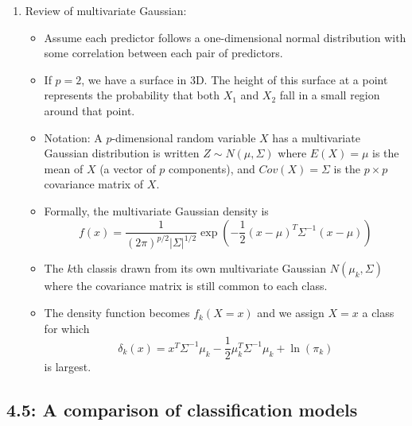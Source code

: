 \documentclass{article}
\begin{document}
\begin{enumerate}
\begin{enumerate}
\item Review of multivariate Gaussian:
\begin{itemize}
\item Assume each predictor follows a one-dimensional normal distribution with some correlation between each pair of predictors.
\item If $p=2$, we have a surface in 3D. The height of this surface at a point represents the probability that both $X_1$ and $X_2$ fall in a small region around that point.
\item Notation: A $p$-dimensional random variable $X$ has a multivariate Gaussian distribution is written $Z \sim N(\mu, \Sigma)$ where $E(X) = \mu$ is the mean of $X$ (a vector of $p$ components), and $Cov(X) = \Sigma$ is the $p \times p$ covariance matrix of $X$.
\item Formally, the multivariate Gaussian density is
\[
f(x) = \frac{1}{(2 \pi)^{p/2} |\Sigma|^{1/2}} \exp \left( - \frac{1}{2} (x-\mu)^T \Sigma^{-1} (x-\mu) \right)
\]
\item The $k$th classis drawn from its own multivariate Gaussian $N(\mu_k, \Sigma)$ where the covariance matrix is still common to each class. 
\item The density function becomes $f_k(X=x)$ and we assign $X=x$ a class for which 
\[
\delta_k(x) = x^T \Sigma^{-1} \mu_k - \frac{1}{2} \mu_k^T \Sigma^{-1} \mu_k + \ln(\pi_k)
\]
is largest.
\end{itemize}
\end{enumerate}

\end{enumerate}

\subsection*{4.5: A comparison of classification models}
\end{document}
